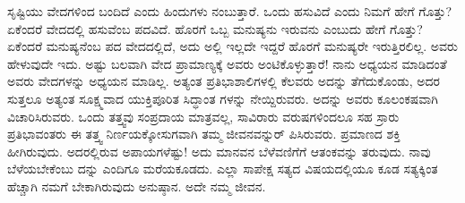 ಸೃಷ್ಟಿಯು ವೇದಗಳಿಂದ ಬಂದಿದೆ ಎಂದು ಹಿಂದುಗಳು ನಂಬುತ್ತಾರೆ. ಒಂದು ಹಸುವಿದೆ ಎಂದು ನಿಮಗೆ ಹೇಗೆ ಗೊತ್ತು? ಏಕೆಂದರೆ ವೇದದಲ್ಲಿ ಹಸುವೆಂಬ ಪದವಿದೆ. ಹೊರಗೆ ಒಬ್ಬ ಮನುಷ್ಯನು ಇರುವನು ಎಂಬುದು ಹೇಗೆ ಗೊತ್ತು? ಏಕೆಂದರೆ ಮನುಷ್ಯನೆಂಬ ಪದ ವೇದದಲ್ಲಿದೆ, ಅದು ಅಲ್ಲಿ ಇಲ್ಲದೇ ಇದ್ದರೆ ಹೊರಗೆ ಮನುಷ್ಯರೇ ಇರುತ್ತಿರಲಿಲ್ಲ. ಅವರು ಹೇಳುವುದೇ ಇದು. ಅಷ್ಟು ಬಲವಾಗಿ ವೇದ ಪ್ರಾಮಾಣ್ಯಕ್ಕೆ ಅವರು ಅಂಟಿಕೊಳ್ಳುತ್ತಾರೆ! ನಾನು ಅಧ್ಯಯನ ಮಾಡಿದಂತೆ ಅವರು ವೇದಗಳನ್ನು ಅಧ್ಯಯನ ಮಾಡಿಲ್ಲ. ಅತ್ಯಂತ ಪ್ರತಿಭಾಶಾಲಿಗಳಲ್ಲಿ ಕೆಲವರು ಅದನ್ನು ತೆಗೆದುಕೊಂಡು, ಅದರ ಸುತ್ತಲೂ ಅತ್ಯಂತ ಸೂಕ್ಷ್ಮವಾದ ಯುಕ್ತಿಪೂರಿತ ಸಿದ್ಧಾಂತ ಗಳನ್ನು ನೇಯ್ದಿರುವರು. ಅದನ್ನು ಅವರು ಕೂಲಂಕಷವಾಗಿ ವಿಚಾರಿಸಿರುವರು. ಒಂದು ತತ್ತ್ವವು ಸಂಪ್ರದಾಯ ಮಾತ್ರವಲ್ಲ, ಸಾವಿರಾರು ವರುಷಗಳಿಂದಲೂ ಸಹ ಸ್ರಾರು ಪ್ರತಿಭಾವಂತರು ಈ ತತ್ತ್ವ ನಿರ್ಣಯಕ್ಕೋಸುಗವಾಗಿ ತಮ್ಮ ಜೀವನವನ್ನುರ್ ಪಿಸಿರುವರು. ಪ್ರಮಾಣದ ಶಕ್ತಿ ಹೀಗಿರುವುದು. ಅದರಲ್ಲಿರುವ ಅಪಾಯಗಳೆಷ್ಟು! ಅದು ಮಾನವನ ಬೆಳೆವಣಿಗೆಗೆ ಆತಂಕವನ್ನು ತರುವುದು. ನಾವು ಬೆಳೆಯಬೇಕೆಂಬು ದನ್ನು ಎಂದಿಗೂ ಮರೆಯಕೂಡದು. ಎಲ್ಲಾ ಸಾಪೇಕ್ಷ ಸತ್ಯದ ವಿಷಯದಲ್ಲಿಯೂ ಕೂಡ ಸತ್ಯಕ್ಕಿಂತ ಹೆಚ್ಚಾಗಿ ನಮಗೆ ಬೇಕಾಗಿರುವುದು ಅನುಷ್ಠಾನ. ಅದೇ ನಮ್ಮ ಜೀವನ.


